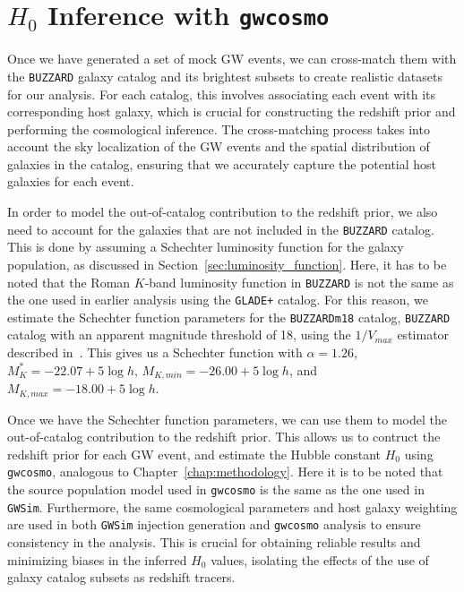 \section{$H_0$ Inference with \texttt{gwcosmo}}
Once we have generated a set of mock \ac{GW} events, we can cross-match them with the \texttt{BUZZARD} galaxy catalog and its brightest subsets to create realistic datasets for our analysis. For each catalog, this involves associating each event with its corresponding host galaxy, which is crucial for constructing the redshift prior and performing the cosmological inference. The cross-matching process takes into account the sky localization of the \ac{GW} events and the spatial distribution of galaxies in the catalog, ensuring that we accurately capture the potential host galaxies for each event.

In order to model the out-of-catalog contribution to the redshift prior, we also need to account for the galaxies that are not included in the \texttt{BUZZARD} catalog. This is done by assuming a Schechter luminosity function for the galaxy population, as discussed in Section~\ref{sec:luminosity_function}. Here, it has to be noted that the Roman $K$-band luminosity function in \texttt{BUZZARD} is not the same as the one used in earlier analysis using the \texttt{GLADE+} catalog. For this reason, we estimate the Schechter function parameters for the \texttt{BUZZARDm18} catalog, \texttt{BUZZARD} catalog with an apparent magnitude threshold of 18, using the $1/V_{max}$ estimator described in~\citet{schmidt1968space,takeuchi2000tests}. This gives us a Schechter function with $\alpha=1.26$, $M^*_{K} = -22.07 +5\log h$, $M_{K, min} = -26.00 +5\log h$, and $M_{K, max} = -18.00 +5\log h$.

Once we have the Schechter function parameters, we can use them to model the out-of-catalog contribution to the redshift prior. This allows us to contruct the redshift prior for each \ac{GW} event, and estimate the Hubble constant $H_0$ using \texttt{gwcosmo}, analogous to Chapter~\ref{chap:methodology}. Here it is to be noted that the source population model used in \texttt{gwcosmo} is the same as the one used in \texttt{GWSim}. Furthermore, the same cosmological parameters and host galaxy weighting are used in both \texttt{GWSim} injection generation and \texttt{gwcosmo} analysis to ensure consistency in the analysis. This is crucial for obtaining reliable results and minimizing biases in the inferred $H_0$ values, isolating the effects of the use of galaxy catalog subsets as redshift tracers.

